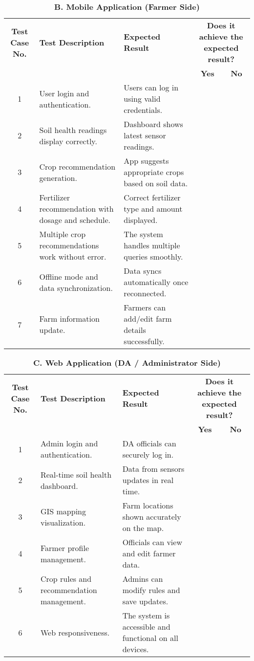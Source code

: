 {	\begin{table}[H]
		\centering
		\renewcommand{\arraystretch}{1.3}
		\caption*{\textbf{B. Mobile Application (Farmer Side)}}
		\begin{tabular}{|c|p{4.5cm}|p{4.5cm}|c|c|}
			\hline
			\textbf{Test Case No.} & \textbf{Test Description} & \textbf{Expected Result} &
			\multicolumn{2}{|c|}{\textbf{Does it achieve the expected result?}} \\ \cline{4-5}
			& & & \textbf{Yes} & \textbf{No} \\ \hline
			1 & User login and authentication. & Users can log in using valid credentials. & & \\ \hline
			2 & Soil health readings display correctly. & Dashboard shows latest sensor readings. & & \\ \hline
			3 & Crop recommendation generation. & App suggests appropriate crops based on soil data. & & \\ \hline
			4 & Fertilizer recommendation with dosage and schedule. & Correct fertilizer type and amount displayed. & & \\ \hline
			5 & Multiple crop recommendations work without error. & The system handles multiple queries smoothly. & & \\ \hline
			6 & Offline mode and data synchronization. & Data syncs automatically once reconnected. & & \\ \hline
			7 & Farm information update. & Farmers can add/edit farm details successfully. & & \\ \hline
		\end{tabular}
	\end{table}
	
	\begin{table}[H]
		\centering
		\renewcommand{\arraystretch}{1.3}
		\caption*{\textbf{C. Web Application (DA / Administrator Side)}}
		\begin{tabular}{|c|p{4.5cm}|p{4.5cm}|c|c|}
			\hline
			\textbf{Test Case No.} & \textbf{Test Description} & \textbf{Expected Result} &
			\multicolumn{2}{|c|}{\textbf{Does it achieve the expected result?}} \\ \cline{4-5}
			& & & \textbf{Yes} & \textbf{No} \\ \hline
			1 & Admin login and authentication. & DA officials can securely log in. & & \\ \hline
			2 & Real-time soil health dashboard. & Data from sensors updates in real time. & & \\ \hline
			3 & GIS mapping visualization. & Farm locations shown accurately on the map. & & \\ \hline
			4 & Farmer profile management. & Officials can view and edit farmer data. & & \\ \hline
			5 & Crop rules and recommendation management. & Admins can modify rules and save updates. & & \\ \hline
			6 & Web responsiveness. & The system is accessible and functional on all devices. & & \\ \hline
		\end{tabular}
	\end{table}
	
}
